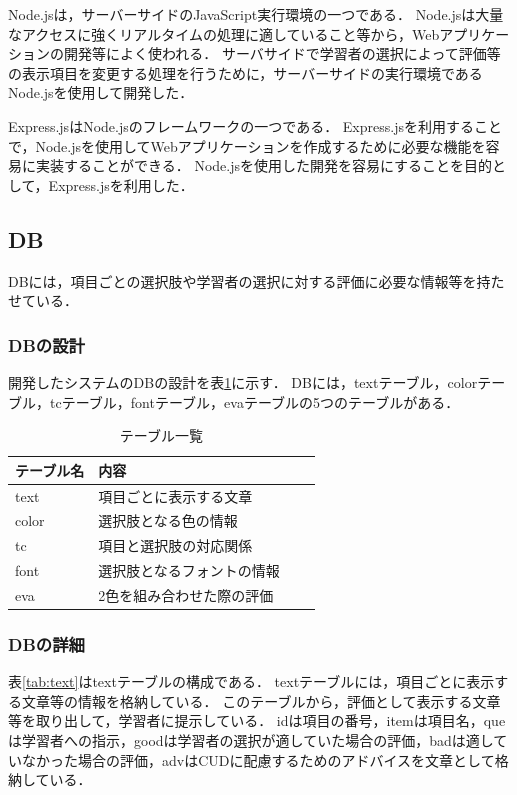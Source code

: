 Node.jsは，サーバーサイドのJavaScript実行環境の一つである．
Node.jsは大量なアクセスに強くリアルタイムの処理に適していること等から，Webアプリケーションの開発等によく使われる．
サーバサイドで学習者の選択によって評価等の表示項目を変更する処理を行うために，サーバーサイドの実行環境であるNode.jsを使用して開発した．

Express.jsはNode.jsのフレームワークの一つである．
Express.jsを利用することで，Node.jsを使用してWebアプリケーションを作成するために必要な機能を容易に実装することができる．
Node.jsを使用した開発を容易にすることを目的として，Express.jsを利用した．

\subsection{DB}
DBには，項目ごとの選択肢や学習者の選択に対する評価に必要な情報等を持たせている．

\subsubsection{DBの設計}
開発したシステムのDBの設計を表\ref{tab:table}に示す．
DBには，textテーブル，colorテーブル，tcテーブル，fontテーブル，evaテーブルの5つのテーブルがある．

\begin{table}[h]
    \caption{テーブル一覧}
   \label{tab:table}
    \centering
    \begin{tabular}{|l||l|l|l|}
        \hline
        テーブル名 & 内容  \\ \hline
        \hline
        text & 項目ごとに表示する文章 \\ \hline
        color & 選択肢となる色の情報 \\ \hline
        tc & 項目と選択肢の対応関係 \\ \hline
        font & 選択肢となるフォントの情報 \\ \hline
        eva & 2色を組み合わせた際の評価 \\ \hline
    \end{tabular}
\end{table}

\subsubsection{DBの詳細}

表\ref{tab:text}はtextテーブルの構成である．
textテーブルには，項目ごとに表示する文章等の情報を格納している．
このテーブルから，評価として表示する文章等を取り出して，学習者に提示している．
idは項目の番号，itemは項目名，queは学習者への指示，goodは学習者の選択が適していた場合の評価，badは適していなかった場合の評価，advはCUDに配慮するためのアドバイスを文章として格納している．

